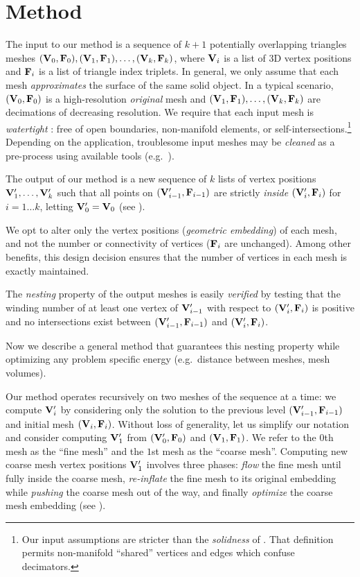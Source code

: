 \section{Method}
\label{sec:method}

The input to our method is a sequence of $k+1$ potentially overlapping
triangles meshes $(\mathbf{V}_0,\mathbf{F}_0),(\mathbf{V}_1,\mathbf{F}_1),\dots,(\mathbf{V}_k,\mathbf{F}_k)$, where $\mathbf{V}_i$ is a
list of 3D vertex positions and $\mathbf{F}_i$ is a list of triangle index triplets.
%
In general, we only assume that each mesh \emph{approximates} the surface of the same
solid object.
%
In a typical scenario, $(\mathbf{V}_0,\mathbf{F}_0)$ is a high-resolution \emph{original} mesh and
$(\mathbf{V}_1,\mathbf{F}_1),\dots,(\mathbf{V}_k,\mathbf{F}_k)$ are decimations of decreasing resolution.
%
We require that each input mesh is \emph{watertight} \cite{Dey:2003jf}:
%
free of open boundaries, non-manifold elements, or
self-intersections.\footnote{Our input assumptions are stricter than the
\emph{solidness} of \cite{Bernstein:2013:PHH}. That definition permits
non-manifold ``shared'' vertices and edges which confuse decimators.}
%
Depending on the application, troublesome input meshes may be \emph{cleaned} as
a pre-process using available tools (e.g.\
\cite{Attene:2010vv,Jacobson:WN:2013}).

The output of our method is a new sequence of $k$ lists of vertex positions 
$\mathbf{V}'_1,\dots,\mathbf{V}'_k$ such that all points on $(\mathbf{V}'_{i-1},\mathbf{F}_{i-1})$ are
strictly
\emph{inside} $(\mathbf{V}'_i,\mathbf{F}_i)$ for $i=1\dots k$, letting $\mathbf{V}'_0 = \mathbf{V}_0$ (see
\reffig{2d-nested-layers-notaion}).

We opt to alter only the vertex positions (\emph{geometric embedding}) of each
mesh, and not the number or connectivity of vertices ($\mathbf{F}_i$ are unchanged). Among
other benefits, this design decision ensures that the number of vertices in each
mesh is exactly maintained.

The \emph{nesting} property of the output meshes is easily \emph{verified} by testing
that the winding number of at least one vertex of $\mathbf{V}'_{i-1}$ with respect to
$(\mathbf{V}'_i,\mathbf{F}_i)$ is positive and no intersections exist between
$(\mathbf{V}'_{i-1},\mathbf{F}_{i-1})$ and $(\mathbf{V}'_i,\mathbf{F}_i)$. 

Now we describe a general method that guarantees this nesting property while
optimizing any problem specific energy (e.g.\ distance between meshes, mesh
volumes).

Our method operates recursively on two meshes of the sequence at a time: we
compute $\mathbf{V}'_i$ by considering only the solution to the previous level
$(\mathbf{V}'_{i-1},\mathbf{F}_{i-1})$ and initial mesh $(\mathbf{V}_i,\mathbf{F}_i)$. 
%
Without loss of generality, let us simplify our notation and consider computing
$\mathbf{V}'_1$ from $(\mathbf{V}'_0,\mathbf{F}_0)$ and $(\mathbf{V}_1,\mathbf{F}_1)$. We refer to the $0$th
mesh as the ``fine mesh'' and the $1$st mesh as the ``coarse mesh''.
%
Computing new coarse mesh vertex positions $\mathbf{V}'_1$ involves three phases:
\emph{flow} the fine mesh until fully inside the coarse mesh, \emph{re-inflate}
the fine mesh to its original embedding while \emph{pushing} the coarse mesh
out of the way, and finally \emph{optimize} the coarse mesh embedding (see
\reffig{2d-pipeline}).

